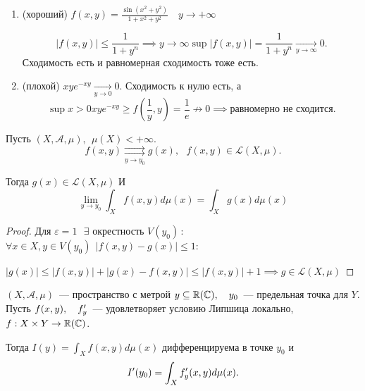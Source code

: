 \begin{example}
    \begin{enumerate}
        \item (хороший) $f(x, y) = \frac{\sin(x^2 + y^2)}{1+ x^2 + y^2}\quad y \to +\infty $
        
        \[|f(x, y) | \leqslant \dfrac{1}{1 + y^n}\implies y\to \infty \sup |f(x, y) | = \dfrac{1}{1 + y^n} \underset{y\to\infty} \to 0. \]
        Сходимость есть и равномерная сходимость тоже есть.
        
        \item (плохой) $x y e^{-xy} \underset{y\to 0}{\to} 0$.
        Сходимость к нулю есть, а
        \[ \sup{x> 0} x y e^{-xy} \geqslant f(\dfrac{1}{y}, y) = \dfrac{1}{e} \not \to 0 \implies \text{равномерно не сходится}. \]
    \end{enumerate}
\end{example}

\begin{statement}
    Пусть $(X, \mathscr{A}, \mu), ~~ \mu(X) < +\infty$.
    \[f(x,y ) \underset{y\to y_0} {\rightrightarrows} g(x),~~~ f(x, y) \in \mathcal{L}(X, \mu). \]

    Тогда $g(x)\in \mathscr{L}(X, \mu)$ И 
    \[\lim_{y \to y_0}\int_X f(x, y)d\mu(x)  = \int_X g(x)d\mu(x)\]    
\end{statement}

\begin{proof}
    Для $\varepsilon  = 1 ~~~ \exists $ окрестность $V(y_0)\,:~ $
    $\forall x \in X, y \in V(y_0)~~ | f(x, y ) - g(x) | \leqslant 1 :$
    
    $|g(x)| \leqslant |f(x,y)| + |g(x) - f(x,y)| \leqslant  |f(x,y)| + 1 \implies g\in \mathscr{L}(X, \mu)$
\end{proof}

\begin{statement}
    $(X, \mathscr{A}, \mu)$~--- пространство с метрой
    $y \subseteq \mathbb{R} (\mathbb{C}), ~~~ y_0$~--- предельная точка для $Y$.
    Пусть $f(x, y),~~~ f^{\prime}_y $~--- удовлетворяет условию Липшица локально, $f: X \times Y \to \mathbb{R} (\mathbb{C})$.

    Тогда $I(y)  = \int_X f(x, y) d\mu (x)$ дифференцируема в точке $y_0$ и
    \[ I^{\prime} (y_0) = \int_X f^{\prime}_y (x, y) d\mu (x).\]
\end{statement}

